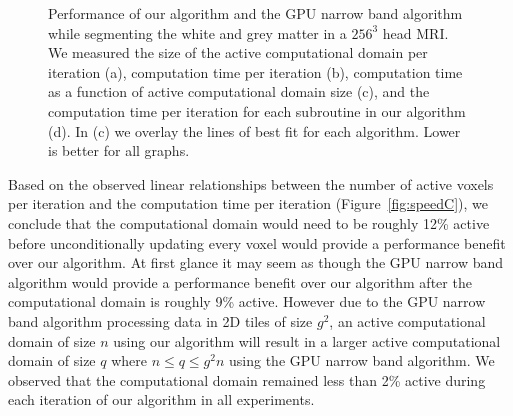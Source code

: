 \documentclass{egpubl}
\begin{document}
{{\begin{figure}[t]
{\label{fig:speedC}
}
\caption{Performance of our algorithm and the GPU narrow band algorithm while segmenting the white and grey matter in a $256^3$ head MRI. We measured the size of the active computational domain per iteration (a), computation time per iteration (b), computation time as a function of active computational domain size (c), and the computation time per iteration for each subroutine in our algorithm (d). In (c) we overlay the lines of best fit for each algorithm. Lower is better for all graphs.}
\label{fig:speed}
\end{figure}



Based on the observed linear relationships between the number of active voxels per iteration and the computation time per iteration (Figure~\ref{fig:speedC}), we conclude that the computational domain would need to be roughly 12\% active before unconditionally updating every voxel would provide a performance benefit over our algorithm. At first glance it may seem as though the GPU narrow band algorithm would provide a performance benefit over our algorithm after the computational domain is roughly 9\% active. However due to the GPU narrow band algorithm processing data in 2D tiles of size $g^2$, an active computational domain of size $n$ using our algorithm will result in a larger active computational domain of size $q$ where $n\le q\le g^2n$ using the GPU narrow band algorithm. We observed that the computational domain remained less than 2\% active during each iteration of our algorithm in all experiments.

}}
\end{document}
